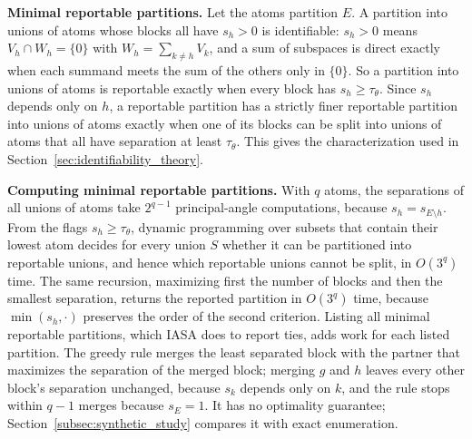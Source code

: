 \noindent\textbf{Minimal reportable partitions.}  Let the atoms partition \(E\).  A
partition into unions of atoms whose blocks all have \(s_h>0\) is identifiable: \(s_h>0\)
means \(V_h\cap W_h=\{0\}\) with \(W_h=\sum_{k\ne h}V_k\), and a sum of subspaces is direct
exactly when each summand meets the sum of the others only in \(\{0\}\).  So a partition
into unions of atoms is reportable exactly when every block has \(s_h\ge\tau_\theta\).
Since \(s_h\) depends only on \(h\), a reportable partition has a strictly finer reportable
partition into unions of atoms exactly when one of its blocks can be split into unions
of atoms that all have separation at least \(\tau_\theta\).  This gives the
characterization used in Section~\ref{sec:identifiability_theory}.

\noindent\textbf{Computing minimal reportable partitions.}  With \(q\) atoms, the
separations of all unions of atoms take \(2^{q-1}\) principal-angle computations,
because \(s_h=s_{E\setminus h}\).  From the flags \(s_h\ge\tau_\theta\), dynamic
programming over subsets that contain their lowest atom decides for every union \(S\)
whether it can be partitioned into reportable unions, and hence which reportable unions
cannot be split, in \(O(3^q)\) time.  The same recursion, maximizing first the number
of blocks and then the smallest separation, returns the reported partition in
\(O(3^q)\) time, because \(\min(s_h,\cdot)\) preserves the order of the second criterion.
Listing all minimal reportable partitions, which IASA does to report ties, adds work for
each listed partition.  The greedy rule merges the least separated block with the
partner that maximizes the separation of the merged block; merging \(g\) and \(h\)
leaves every other block's separation unchanged, because \(s_k\) depends only on \(k\),
and the rule stops within \(q-1\) merges because \(s_E=1\).  It has no optimality
guarantee; Section~\ref{subsec:synthetic_study} compares it with exact enumeration.

